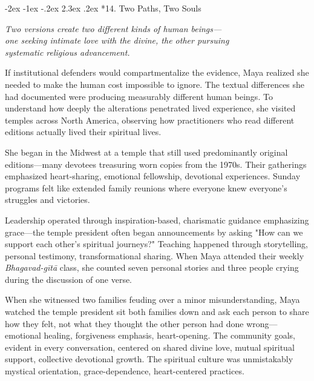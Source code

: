 \documentclass[12pt,twoside]{book}
\makeatletter
\renewcommand\section{\@startsection{section}{1}{\z@}%
{-3.5ex \@plus -1ex \@minus -.2ex}%
{2.3ex \@plus.2ex}%
{\normalfont\Large\bfseries}}
\let\oldsection\section
\renewcommand{\section}[1]{\needspace{4\baselineskip}\oldsection{#1}}
\renewcommand\section{\@startsection{section}{1}{\z@}%
{-2ex \@plus -1ex \@minus -.2ex}%
{2.3ex \@plus.2ex}%
{\normalfont\Large\bfseries}}
\makeatother
\begin{document}
\section*{14. Two Paths, Two Souls}
\thispagestyle{chapterpage}

{\centering\itshape Two versions create two different kinds of human beings—\\one seeking intimate love with the divine, the other pursuing\\systematic religious advancement.\par}
\vspace{0.1cm}

\normalfont\justifying
\pagestyle{fancy}
If institutional defenders would compartmentalize the evidence, Maya realized she needed to make the human cost impossible to ignore. The textual differences she had documented were producing measurably different human beings. To understand how deeply the alterations penetrated lived experience, she visited temples across North America, observing how practitioners who read different editions actually lived their spiritual lives.

She began in the Midwest at a temple that still used predominantly original editions—many devotees treasuring worn copies from the 1970s. Their gatherings emphasized heart-sharing, emotional fellowship, devotional experiences. Sunday programs felt like extended family reunions where everyone knew everyone's struggles and victories.

Leadership operated through inspiration-based, charismatic guidance emphasizing grace—the temple president often began announcements by asking "How can we support each other's spiritual journeys?" Teaching happened through storytelling, personal testimony, transformational sharing. When Maya attended their weekly \emph{Bhagavad-gītā} class, she counted seven personal stories and three people crying during the discussion of one verse.

When she witnessed two families feuding over a minor misunderstanding, Maya watched the temple president sit both families down and ask each person to share how they felt, not what they thought the other person had done wrong—emotional healing, forgiveness emphasis, heart-opening. The community goals, evident in every conversation, centered on shared divine love, mutual spiritual support, collective devotional growth. The spiritual culture was unmistakably mystical orientation, grace-dependence, heart-centered practices.
\end{document}
